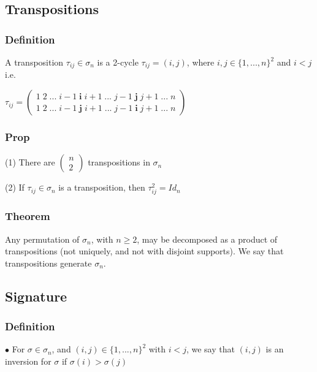         \subsection{Transpositions}
            \subsubsection{Definition}
                A transposition $\tau_{ij}\in\sigma_n$ is a 2-cycle $\tau_{ij}=(i,j)$, where $i,j\in\{1,...,n\}^2$ and $i<j$ i.e. 
                
                $\tau_{ij}=\left(\begin{array}{cc}
                    1 \; 2\; ...\; i-1\;\mathbf{i}\; i+1\; ... \; j-1 \;\mathbf{j}\; j+1\; ...\; n \\
                    1 \; 2\; ...\; i-1 \;\textbf{j}\; i+1\; ...\; j-1 \;\textbf{i}\; j+1\; ...\; n
                \end{array}\right)
                $

            \subsubsection{Prop}
                (1) There are $\left(\begin{array}{cc} n \\ 2 \end{array}\right)$ transpositions in $\sigma_n$

                \noindent (2) If $\tau_{ij}\in\sigma_n$ is a transposition, then $\tau^2_{ij}=Id_n$

            \subsubsection{Theorem}
                Any permutation of $\sigma_n$, with $n\geq 2$, may be decomposed as a product of transpositions (not uniquely, and not with disjoint supports). We say that transpositions generate $\sigma_n$.

        \newpage

        \subsection{Signature}
            \subsubsection{Definition}
                $\bullet$ For $\sigma\in\sigma_n$, and $(i,j)\in\{1,...,n\}^2$ with $i<j$, we say that $(i,j)$ is an inversion for $\sigma$ if $\sigma(i)>\sigma(j)$

